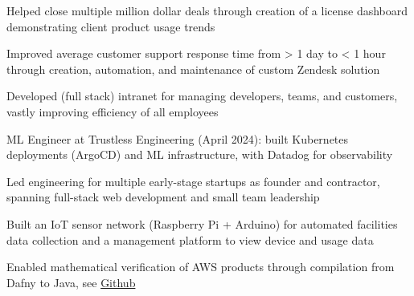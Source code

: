 \documentclass[]{jack-resume}
\begin{document}
\begin{tightemize}
    \item Helped close multiple million dollar deals through creation of a license dashboard demonstrating client product usage trends
    \item Improved average customer support response time from > 1 day to < 1 hour through creation, automation, and maintenance of custom Zendesk solution
    \item Developed (full stack) intranet for managing developers, teams, and customers, vastly improving efficiency of all employees
\end{tightemize}
\sectionsep

\begin{tightemize}
    \item ML Engineer at Trustless Engineering (April 2024): built Kubernetes deployments (ArgoCD) and ML infrastructure, with Datadog for observability
    \item Led engineering for multiple early-stage startups as founder and contractor, spanning full-stack web development and small team leadership
\end{tightemize}
\sectionsep

\begin{tightemize}
    \item Built an IoT sensor network (Raspberry Pi + Arduino) for automated facilities data collection and a management platform to view device and usage data
\end{tightemize}

\begin{tightemize}
    \item Enabled mathematical verification of AWS products through compilation from Dafny to Java, see \href{https://github.com/dafny-lang/dafny}{Github \ExternalLink}
\end{tightemize}
\sectionsep
\end{document}
